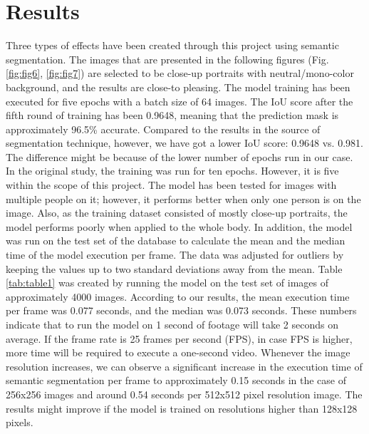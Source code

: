 \documentclass[english]{sbrt}
\begin{document}
\section{Results}
Three types of effects have been created through this project using semantic segmentation. The images that are presented in the following figures  (Fig. \ref{fig:fig6}, \ref{fig:fig7}) are selected to be close-up portraits with neutral/mono-color background, and the results are close-to pleasing. 
The model training has been executed for five epochs with a batch size of 64 images. The IoU score after the fifth round of training has been 0.9648, meaning that the prediction mask is approximately 96.5\% accurate. Compared to the results in the source of segmentation technique, however, we have got a lower IoU score: 0.9648 vs. 0.981. The difference might be because of the lower number of epochs run in our case. In the original study, the training was run for ten epochs. However, it is five within the scope of this project. 
The model has been tested for images with multiple people on it; however, it performs better when only one person is on the image. Also, as the training dataset consisted of mostly close-up portraits, the model performs poorly when applied to the whole body. 
In addition, the model was run on the test set of the database to calculate the mean and the median time of the model execution per frame. The data was adjusted for outliers by keeping the values up to two standard deviations away from the mean. Table \ref{tab:table1} was created by running the model on the test set of images of approximately 4000 images. According to our results, the mean execution time per frame was 0.077 seconds, and the median was 0.073 seconds. These numbers indicate that to run the model on 1 second of footage will take 2 seconds on average. If the frame rate is 25 frames per second (FPS), in case FPS is higher, more time will be required to execute a one-second video. Whenever the image resolution increases, we can observe a significant increase in the execution time of semantic segmentation per frame to approximately 0.15 seconds in the case of 256x256 images and around 0.54 seconds per 512x512 pixel resolution image. The results might improve if the model is trained on resolutions higher than 128x128 pixels.
\end{document}
